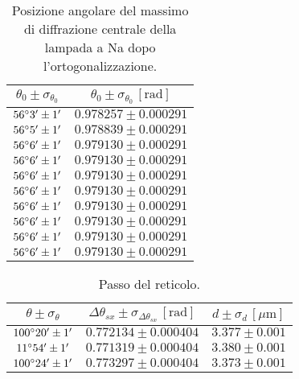 \documentclass[]{article}
\begin{document}
    \begin{table}[H]
        \centering
        \begin{tabular}{||c|c||}
            \hline
            $\theta_0 \pm \sigma_{\theta_0}$ & $\theta_0 \pm \sigma_{\theta_0} \, \left[\text{rad}\right]$ \\\hline
            \hline
            $56\degree 3' \pm 1'$ & $0.978257 \pm 0.000291$ \\\hline
            $56\degree 5' \pm 1'$ & $0.978839 \pm 0.000291$ \\\hline
            $56\degree 6' \pm 1'$ & $0.979130 \pm 0.000291$ \\\hline
            $56\degree 6' \pm 1'$ & $0.979130 \pm 0.000291$ \\\hline
            $56\degree 6' \pm 1'$ & $0.979130 \pm 0.000291$ \\\hline
            $56\degree 6' \pm 1'$ & $0.979130 \pm 0.000291$ \\\hline
            $56\degree 6' \pm 1'$ & $0.979130 \pm 0.000291$ \\\hline
            $56\degree 6' \pm 1'$ & $0.979130 \pm 0.000291$ \\\hline
            $56\degree 6' \pm 1'$ & $0.979130 \pm 0.000291$ \\\hline
            $56\degree 6' \pm 1'$ & $0.979130 \pm 0.000291$ \\\hline
        \end{tabular}
        \caption{Posizione angolare del massimo di diffrazione centrale della lampada a Na dopo l'ortogonalizzazione.}
        \label{max-Na}
    \end{table}

    \begin{table}[H]
        \centering
        \begin{tabular}{||c|c|c||}
            \hline
            $\theta \pm \sigma_{\theta}$ & $\Delta\theta_{sx} \pm \sigma_{\Delta\theta_{sx}} \, \left[\text{rad}\right]$ & $d \pm \sigma_d \,\left[\mu\text{m}\right]$ \\\hline
            \hline
            $100\degree 20' \pm 1'$ & $0.772134 \pm 0.000404$ & $3.377 \pm 0.001$ \\\hline
            $ 11\degree 54' \pm 1'$ & $0.771319 \pm 0.000404$ & $3.380 \pm 0.001$ \\\hline
            $100\degree 24' \pm 1'$ & $0.773297 \pm 0.000404$ & $3.373 \pm 0.001$ \\\hline
        \end{tabular}
        \caption{Passo del reticolo.}
        \label{d-Na}
    \end{table}
\end{document}
